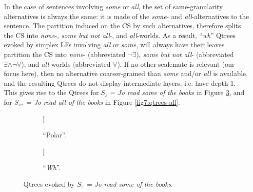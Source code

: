 In the case of sentences involving \textit{some} or \textit{all}, the set of same-granularity alternatives is always the same: it is made of the \textit{some}- and \textit{all}-alternatives to the sentence. The partition induced on the CS by such alternatives, therefore splits the CS into \textit{none}-, \textit{some but not all}-, and \textit{all}-worlds. As a result, ``\textit{wh}'' Qtrees evoked by simplex LFs involving \textit{all} or \textit{some}, will always have their leaves partition the CS into \textit{none}- (abbreviated $\neg\exists$), \textit{some but not all}- (abbreviated $\exists\wedge\neg\forall$), and \textit{all}-worlds (abbreviated $\forall$). If no other scalemate is relevant (our focus here),
then no alternative coarser-grained than \textit{some} and/or \textit{all} is available, and the resulting Qtrees do not display intermediate layers, i.e. have depth $1$. This gives rise to the Qtrees for $S_{s}$ = \textit{Jo read some of the books} in Figure \ref{fig7:qtrees-some}, and for $S_{s^+}$ = \textit{Jo read all of the books} in Figure \ref{fig7:qtrees-all}. 

\begin{figure}[H]
	\centering
	\begin{subfigure}[b]{.45\linewidth}
		\centering
		\begin{forest}
			[CS[$\neg\exists$][\fbox{$\exists$}]]
		\end{forest}
		\caption[]{``Polar''.}\label{fig7:qtree-some-polar}
	\end{subfigure}
	\hfill
	\begin{subfigure}[b]{.45\linewidth}
		\centering
		\begin{forest}
			[CS[$\neg\exists$][\fbox{$\exists\wedge\neg\forall$}][\fbox{$\forall$}]]
		\end{forest}
		\caption[]{``\textit{Wh}''.}\label{fig7:qtree-some-wh}
	\end{subfigure}
	\caption[]{Qtrees evoked by $S_{\s}$ = \textit{Jo read some of the books}. }\label{fig7:qtrees-some}
\end{figure}


